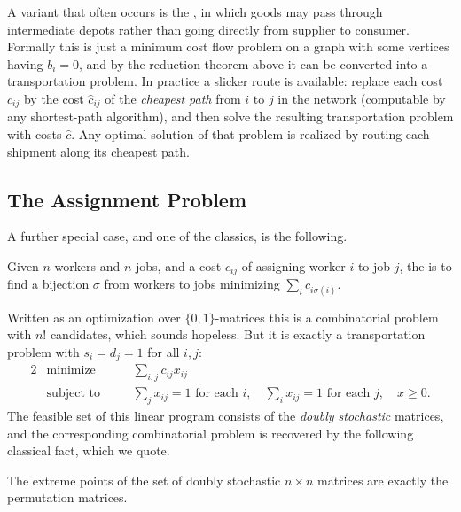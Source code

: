 \documentclass[a4paper]{scrartcl}
\begin{document}
\begin{remark}[Transshipment]
    A variant that often occurs is the , in which goods may pass through intermediate depots rather than going directly from supplier to consumer. Formally this is just a minimum cost flow problem on a graph with some vertices having $b_i = 0$, and by the reduction theorem above it can be converted into a transportation problem. In practice a slicker route is available: replace each cost $c_{ij}$ by the cost $\hat c_{ij}$ of the \emph{cheapest path} from $i$ to $j$ in the network (computable by any shortest-path algorithm), and then solve the resulting transportation problem with costs $\hat c$. Any optimal solution of that problem is realized by routing each shipment along its cheapest path.
\end{remark}

\subsection{The Assignment Problem}

A further special case, and one of the classics, is the following.

\begin{definition}
    Given $n$ workers and $n$ jobs, and a cost $c_{ij}$ of assigning worker $i$ to job $j$, the  is to find a bijection $\sigma$ from workers to jobs minimizing $\sum_i c_{i\sigma(i)}$.
\end{definition}

Written as an optimization over $\{0,1\}$-matrices this is a combinatorial problem with $n!$ candidates, which sounds hopeless. But it is exactly a transportation problem with $s_i = d_j = 1$ for all $i, j$:
\begin{alignat*}{2}
    & \text{minimize} \quad && \sum_{i,j}c_{ij}x_{ij} \\
    & \text{subject to} \quad && \textstyle\sum_j x_{ij} = 1 \text{ for each } i,\quad \sum_i x_{ij} = 1 \text{ for each } j,\quad x \geq 0.
\end{alignat*}
The feasible set of this linear program consists of the \emph{doubly stochastic} matrices, and the corresponding combinatorial problem is recovered by the following classical fact, which we quote.

\begin{theorem}
    The extreme points of the set of doubly stochastic $n \times n$ matrices are exactly the permutation matrices.
\end{theorem}
\end{document}
